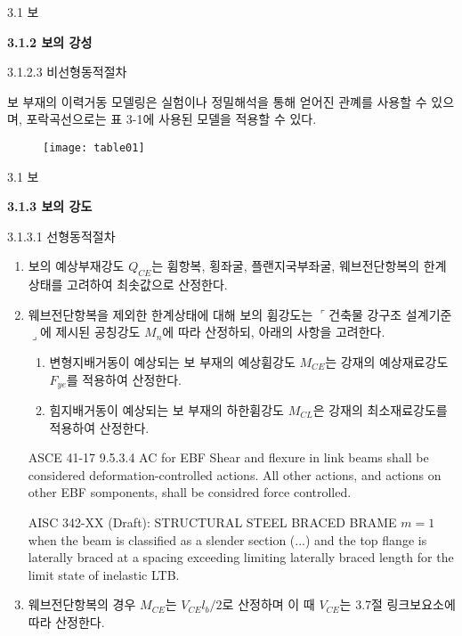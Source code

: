 \begin{frame}{3.1 보}

	\textbf{3.1.2 보의 강성}

3.1.2.3 비선형동적절차

보 부재의 이력거동 모델링은 실험이나 정밀해석을 통해 얻어진 관꼐를 사용할 수 있으며, 포락곡선으로는 표 3-1에 사용된 모델을 적용할 수 있다. 

		\begin{figure}
		\centering
		\texttt{[image: table01]}
	\end{figure}
\end{frame}


\begin{frame}{3.1 보}

	\textbf{3.1.3 보의 강도}

3.1.3.1 선형동적절차

\begin{enumerate}
	\item[(1)] 보의 예상부재강도 $Q_{CE}$는 휨항복, 횡좌굴, 플랜지국부좌굴, 웨브전단항복의 한계상태를 고려하여 최솟값으로 산정한다. 
	\item[(2)] 웨브전단항복을 제외한 한계상태에 대해 보의 휨강도는 $\ulcorner$건축물 강구조 설계기준$\lrcorner$에 제시된 공칭강도 $M_n$에 따라 산정하되, 아래의 사항을 고려한다. 
	\begin{enumerate}[label=\large\protect\textcircled{\small\arabic*}]
		\item 변형지배거동이 예상되는 보 부재의 예상휨강도 $M_{CE}$는 강재의 예상재료강도 $F_{ye}$를 적용하여 산정한다. 
		\item 힘지배거동이 예상되는 보 부재의 하한휨강도 $M_{CL}$은 강재의 최소재료강도를 적용하여 산정한다. 
	\end{enumerate}
	\begin{block}{ASCE 41-17 9.5.3.4 AC for EBF}
Shear and flexure in link beams shall be considered deformation-controlled actions. All other actions, and actions on other EBF somponents, shall be considred force controlled. 
	\end{block}		
\begin{block}{AISC 342-XX (Draft): STRUCTURAL STEEL BRACED BRAME}
	$m=1$ when the beam is classified as a slender section (...) and the top flange is laterally braced at a spacing exceeding limiting laterally braced length for the limit state of inelastic LTB.
\end{block}	
	\item[(3)] 웨브전단항복의 경우 $M_{CE}$는 $V_{CE}l_b/2$로 산정하며 이 때 $V_{CE}$는 3.7절 링크보요소에 따라 산정한다.  
\end{enumerate}
\end{frame}	


